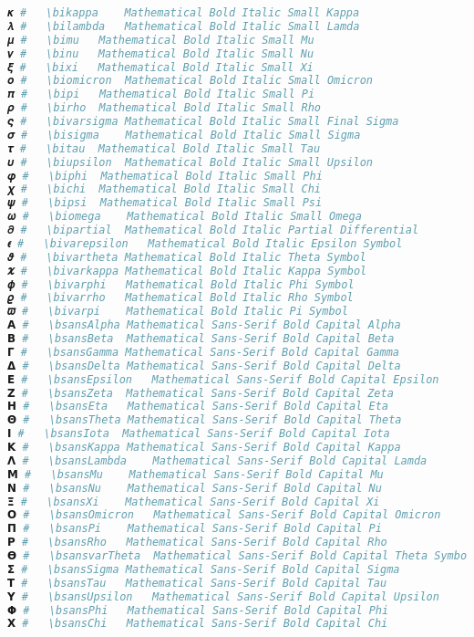 \begin{lstlisting}[language=Julia]
𝜿 #   \bikappa    Mathematical Bold Italic Small Kappa
𝝀 #   \bilambda   Mathematical Bold Italic Small Lamda
𝝁 #   \bimu   Mathematical Bold Italic Small Mu
𝝂 #   \binu   Mathematical Bold Italic Small Nu
𝝃 #   \bixi   Mathematical Bold Italic Small Xi
𝝄 #   \biomicron  Mathematical Bold Italic Small Omicron
𝝅 #   \bipi   Mathematical Bold Italic Small Pi
𝝆 #   \birho  Mathematical Bold Italic Small Rho
𝝇 #   \bivarsigma Mathematical Bold Italic Small Final Sigma
𝝈 #   \bisigma    Mathematical Bold Italic Small Sigma
𝝉 #   \bitau  Mathematical Bold Italic Small Tau
𝝊 #   \biupsilon  Mathematical Bold Italic Small Upsilon
𝝋 #   \biphi  Mathematical Bold Italic Small Phi
𝝌 #   \bichi  Mathematical Bold Italic Small Chi
𝝍 #   \bipsi  Mathematical Bold Italic Small Psi
𝝎 #   \biomega    Mathematical Bold Italic Small Omega
𝝏 #   \bipartial  Mathematical Bold Italic Partial Differential
𝝐 #   \bivarepsilon   Mathematical Bold Italic Epsilon Symbol
𝝑 #   \bivartheta Mathematical Bold Italic Theta Symbol
𝝒 #   \bivarkappa Mathematical Bold Italic Kappa Symbol
𝝓 #   \bivarphi   Mathematical Bold Italic Phi Symbol
𝝔 #   \bivarrho   Mathematical Bold Italic Rho Symbol
𝝕 #   \bivarpi    Mathematical Bold Italic Pi Symbol
𝝖 #   \bsansAlpha Mathematical Sans-Serif Bold Capital Alpha
𝝗 #   \bsansBeta  Mathematical Sans-Serif Bold Capital Beta
𝝘 #   \bsansGamma Mathematical Sans-Serif Bold Capital Gamma
𝝙 #   \bsansDelta Mathematical Sans-Serif Bold Capital Delta
𝝚 #   \bsansEpsilon   Mathematical Sans-Serif Bold Capital Epsilon
𝝛 #   \bsansZeta  Mathematical Sans-Serif Bold Capital Zeta
𝝜 #   \bsansEta   Mathematical Sans-Serif Bold Capital Eta
𝝝 #   \bsansTheta Mathematical Sans-Serif Bold Capital Theta
𝝞 #   \bsansIota  Mathematical Sans-Serif Bold Capital Iota
𝝟 #   \bsansKappa Mathematical Sans-Serif Bold Capital Kappa
𝝠 #   \bsansLambda    Mathematical Sans-Serif Bold Capital Lamda
𝝡 #   \bsansMu    Mathematical Sans-Serif Bold Capital Mu
𝝢 #   \bsansNu    Mathematical Sans-Serif Bold Capital Nu
𝝣 #   \bsansXi    Mathematical Sans-Serif Bold Capital Xi
𝝤 #   \bsansOmicron   Mathematical Sans-Serif Bold Capital Omicron
𝝥 #   \bsansPi    Mathematical Sans-Serif Bold Capital Pi
𝝦 #   \bsansRho   Mathematical Sans-Serif Bold Capital Rho
𝝧 #   \bsansvarTheta  Mathematical Sans-Serif Bold Capital Theta Symbol
𝝨 #   \bsansSigma Mathematical Sans-Serif Bold Capital Sigma
𝝩 #   \bsansTau   Mathematical Sans-Serif Bold Capital Tau
𝝪 #   \bsansUpsilon   Mathematical Sans-Serif Bold Capital Upsilon
𝝫 #   \bsansPhi   Mathematical Sans-Serif Bold Capital Phi
𝝬 #   \bsansChi   Mathematical Sans-Serif Bold Capital Chi

\end{lstlisting}
